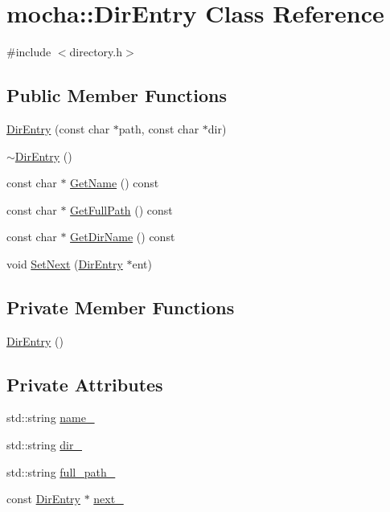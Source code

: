 \hypertarget{classmocha_1_1_dir_entry}{
\section{mocha::DirEntry Class Reference}
\label{classmocha_1_1_dir_entry}
}


{\ttfamily \#include $<$directory.h$>$}

\subsection*{Public Member Functions}
\begin{DoxyCompactItemize}
\item 
\hyperlink{classmocha_1_1_dir_entry_afcec06b8ebc51d9cc914a53282b28bae}{DirEntry} (const char $\ast$path, const char $\ast$dir)
\item 
\hyperlink{classmocha_1_1_dir_entry_a865911e82d9b09796173f18bac8ccd7e}{$\sim$DirEntry} ()
\item 
const char $\ast$ \hyperlink{classmocha_1_1_dir_entry_aa35e4e487db311e479fc7eb9a5d7a459}{GetName} () const 
\item 
const char $\ast$ \hyperlink{classmocha_1_1_dir_entry_a85f99f5336f997212d9920b09073cee3}{GetFullPath} () const 
\item 
const char $\ast$ \hyperlink{classmocha_1_1_dir_entry_a1e30c41653b46a081cee15f003248c53}{GetDirName} () const 
\item 
void \hyperlink{classmocha_1_1_dir_entry_abec849ef6f0736a70faac0f436c9519f}{SetNext} (\hyperlink{classmocha_1_1_dir_entry}{DirEntry} $\ast$ent)
\end{DoxyCompactItemize}
\subsection*{Private Member Functions}
\begin{DoxyCompactItemize}
\item 
\hyperlink{classmocha_1_1_dir_entry_a280456e530b249c5b5891ee027a971c1}{DirEntry} ()
\end{DoxyCompactItemize}
\subsection*{Private Attributes}
\begin{DoxyCompactItemize}
\item 
std::string \hyperlink{classmocha_1_1_dir_entry_a1fffe6a5d6f268f6a00f16e4fbce433d}{name\_\-}
\item 
std::string \hyperlink{classmocha_1_1_dir_entry_aa7c3d579d46d694ac584f3f197c43d8d}{dir\_\-}
\item 
std::string \hyperlink{classmocha_1_1_dir_entry_ad257721184bc483c22fb639f3e98e6ad}{full\_\-path\_\-}
\item 
const \hyperlink{classmocha_1_1_dir_entry}{DirEntry} $\ast$ \hyperlink{classmocha_1_1_dir_entry_aaedb913694aacd4b88c6ccc5daf78ae8}{next\_\-}
\end{DoxyCompactItemize}
